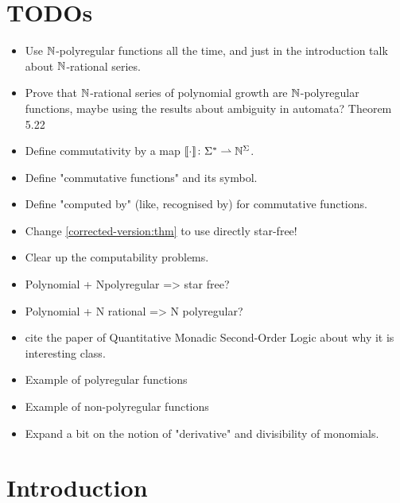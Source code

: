 \documentclass[sigconf,natbib=false,screen, review,anonymous]{acmart}
\begin{document}
\maketitle
\acknowledge

\section{TODOs}

\begin{itemize}
    \item Use $\mathbb{N}$-polyregular functions all the time, and just 
        in the introduction talk about $\mathbb{N}$-rational series.
    \item Prove that $\mathbb{N}$-rational series of polynomial 
        growth are $\mathbb{N}$-polyregular functions, maybe using
        the results about ambiguity in automata?
        Theorem 5.22
    \item Define commutativity by a map 
        $\commute \colon \Sigma^* \topartial \Nat^{\Sigma}$.
    \item Define "commutative functions" and its symbol.
    \item Define "computed by" (like, recognised by) for commutative 
        functions.
    \item Change \cref{corrected-version:thm} to use directly
        star-free!
    \item Clear up the computability problems.
    \item Polynomial + Npolyregular => star free?
    \item Polynomial + N rational => N polyregular?
    \item cite the paper of Quantitative Monadic Second-Order Logic
        about why it is interesting class.
    \item Example of polyregular functions
    \item Example of non-polyregular functions
    \item Expand a bit on the notion of "derivative"
        and divisibility of monomials.
\end{itemize}



\section{Introduction}
\end{document}
